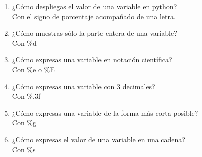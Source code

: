 \documentclass[letterpaper, 12pt, oneside]{article} %
\begin{document}
\begin{enumerate}
		\item ¿Cómo despliegas el valor de una variable en python?\\Con el signo de porcentaje acompañado de una letra.
		\item ¿Cómo muestras sólo la parte entera de una variable?\\Con $\%$d
		\item ¿Cómo expresas una variable en notación científica?\\Con $\%$e o $\%$E
		\item ¿Cómo expresas una variable con 3 decimales?\\Con $\%$.3f
		\item ¿Cómo expresas una variable de la forma más corta posible?\\Con $\%$g
		\item ¿Cómo expresas el valor de una variable en una cadena?\\Con $\%$s
	\end{enumerate}
\end{document}
